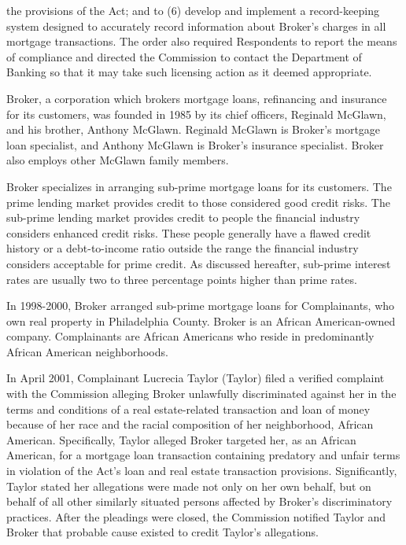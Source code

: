 the provisions of the Act; and to (6) develop and implement a record-keeping
system designed to accurately record information about Broker's charges in all
mortgage transactions. The order also required Respondents to report the means of compliance
and directed the Commission to contact the Department of Banking so that it may
take such licensing action as it deemed appropriate.



Broker, a corporation which brokers mortgage loans, refinancing and insurance
for its customers, was founded in 1985 by its chief officers, Reginald McGlawn,
and his brother, Anthony McGlawn. Reginald McGlawn is Broker's mortgage loan
specialist, and Anthony McGlawn is Broker's insurance specialist. Broker also
employs other McGlawn family members.

Broker specializes in arranging sub-prime mortgage loans for its customers. The
prime lending market provides credit to those considered good credit risks. The
sub-prime lending market provides credit to people the financial industry
considers enhanced credit risks. These people generally have a flawed credit
history or a debt-to-income ratio outside the range the financial industry
considers acceptable for prime credit. As discussed hereafter, sub-prime
interest rates are usually two to three percentage points higher than prime
rates.

In 1998-2000, Broker arranged sub-prime mortgage loans for Complainants, who own
real property in Philadelphia County. Broker is an African American-owned
company. Complainants are African Americans who reside in predominantly African
American neighborhoods.

In April 2001, Complainant Lucrecia Taylor (Taylor) filed a verified complaint
with the Commission alleging Broker unlawfully discriminated against her in the
terms and conditions of a real estate-related transaction and loan of money
because of her race and the racial composition of her neighborhood, African
American. Specifically, Taylor alleged Broker targeted her, as an African
American, for a mortgage loan transaction containing predatory and unfair terms
in violation of the Act's loan and real estate transaction provisions.
Significantly, Taylor stated her allegations were made not only on her own
behalf, but on behalf of all other similarly situated persons affected by
Broker's discriminatory practices. After the pleadings were closed, the
Commission notified Taylor and Broker that probable cause existed to credit
Taylor's allegations.

